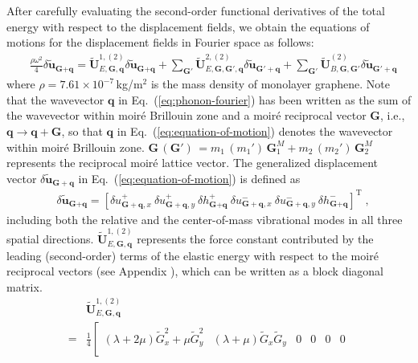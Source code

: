 \documentclass[aps,prx,10pt,twocolumn,superscriptaddress]{revtex4}
\def\IV{{\uppercase\expandafter{\romannumeral 4}}}
\def\nn{\nonumber\\}
\def\nn{\nonumber\\}
\begin{document}
\begin{widetext}
After carefully evaluating the second-order functional derivatives of the total energy with respect to the displacement fields, we obtain the  equations of motions for the displacement fields in  Fourier space as follows:
\begin{align}
&\frac{\rho\omega^{2}}{4}\delta\tilde{\mathbf{u}}_{\textbf{G}+\textbf{q}}=\tilde{\textbf{U}}^{1,(2)}_{E,\textbf{G},\textbf{q}}\delta\tilde{\mathbf{u}}_{\textbf{G}+\textbf{q}}+\sum_{\textbf{G}'}\tilde{\textbf{U}}^{2,(2)}_{E,\textbf{G},\textbf{G}',\textbf{q}}\delta\tilde{\mathbf{u}}_{\textbf{G}'+\textbf{q}}+\sum_{\textbf{G}'}\tilde{\textbf{U}}^{(2)}_{B,\textbf{G},\textbf{G}'}\delta\tilde{\mathbf{u}}_{\textbf{G}'+\textbf{q}}
\label{eq:equation-of-motion}
\end{align}
where $\rho\!=\!7.61\times10^{-7}\,$kg/$\textrm{m}^{2}$ is the mass density of monolayer graphene.  Note that the wavevector $\mathbf{q}$ in Eq.~(\ref{eq:phonon-fourier}) has been written as the sum of  the wavevector within moir\'e Brillouin zone and a moir\'e reciprocal vector $\mathbf{G}$, i.e., $\mathbf{q}\to\mathbf{q}+\mathbf{G}$, so that $\textbf{q}$ in Eq.~(\ref{eq:equation-of-motion}) denotes the wavevector within moir\'e Brillouin zone.
$\textbf{G}\,(\textbf{G}')\,\!=\!m_{1}\, (m_1')\, \textbf{G}^{M}_{1}+m_{2}\, (m_2')\, \textbf{G}^{M}_{2}$  represents the reciprocal moir\'e lattice vector. The generalized displacement vector $\delta \tilde{\mathbf{u}}_{\mathbf{G}+\mathbf{q}}$ in Eq.~(\ref{eq:equation-of-motion}) is defined as
\begin{align}
&\delta\tilde{\textbf{u}}_{\textbf{G}+\textbf{q}}=[\delta u^{+}_{\textbf{G}+\textbf{q},x}\ \delta u^{+}_{\textbf{G}+\textbf{q},y}\ \delta h^{+}_{\textbf{G}+\textbf{q}}\ \delta u^{-}_{\textbf{G}+\textbf{q},x}\ \delta u^{-}_{\textbf{G}+\textbf{q},y}\ \delta h^{-}_{\textbf{G}+\textbf{q}} ]^{\mathrm{T}}\;,
\label{eq:u-field}
\end{align}
including both the relative and the center-of-mass vibrational modes in all three spatial directions. $\tilde{\textbf{U}}^{1,(2)}_{E,\textbf{G},\textbf{q}}$ represents the force constant contributed by the leading (second-order) terms of  the elastic energy with respect to the moir\'e reciprocal vectors (see Appendix \IV), which can be written as a block diagonal matrix. 
\begin{align}
&\tilde{\textbf{U}}^{1,(2)}_{E,\textbf{G},\textbf{q}}\;\nn
=&\frac{1}{4}\left[\begin{array}{cccccc}
				(\lambda+2\mu)\tilde{G}^{2}_{x}+\mu \tilde{G}^{2}_{y} & (\lambda+\mu)\tilde{G}_{x}\tilde{G}_{y}&0&0&0&0 \\

\end{array}
\end{align}
\end{widetext}
\end{document}
